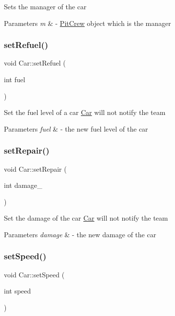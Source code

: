 Sets the manager of the car 
\begin{DoxyParams}{Parameters}
{\em m} & -\/ \mbox{\hyperlink{class_pit_crew}{Pit\+Crew}} object which is the manager \\
\hline
\end{DoxyParams}
\mbox{\label{class_car_a57adfd20b916e5b22c7d4fb5989f671e}} 
\subsubsection{\texorpdfstring{set\+Refuel()}{setRefuel()}}
{\footnotesize\ttfamily void Car\+::set\+Refuel (\begin{DoxyParamCaption}\item[{int}]{fuel }\end{DoxyParamCaption})}

Set the fuel level of a car \mbox{\hyperlink{class_car}{Car}} will not notify the team 
\begin{DoxyParams}{Parameters}
{\em fuel} & -\/ the new fuel level of the car \\
\hline
\end{DoxyParams}
\mbox{\label{class_car_a5ee7015f3f094416513a718cd38b0a10}} 
\subsubsection{\texorpdfstring{set\+Repair()}{setRepair()}}
{\footnotesize\ttfamily void Car\+::set\+Repair (\begin{DoxyParamCaption}\item[{int}]{damage\+\_\+ }\end{DoxyParamCaption})}

Set the damage of the car \mbox{\hyperlink{class_car}{Car}} will not notify the team 
\begin{DoxyParams}{Parameters}
{\em damage} & -\/ the new damage of the car \\
\hline
\end{DoxyParams}
\mbox{\label{class_car_acf64780a1426bea0549759c1a0b83838}} 
\subsubsection{\texorpdfstring{set\+Speed()}{setSpeed()}}
{\footnotesize\ttfamily void Car\+::set\+Speed (\begin{DoxyParamCaption}\item[{int}]{speed }\end{DoxyParamCaption})\hspace{0.3cm}{\ttfamily [inline]}}

